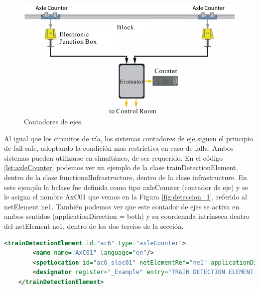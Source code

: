     \begin{figure}[!h]
        \centering
        \includegraphics[width=1\textwidth]{Figuras/contador.jpg}
        \centering\caption{Contadores de ejes.}
        \label{fig:deteccion_2}
    \end{figure}

    Al igual que los circuitos de vía, los sistemas contadores de eje siguen el principio de fail-safe, adoptando la condición mas restrictiva en caso de falla. Ambos sistemas pueden utilizarse en simultáneo, de ser requerido. En el código \ref{lst:axleCounter} podemos ver un ejemplo de la clase trainDetectionElement, dentro de la clase functionalInfrastructure, dentro de la clase infrastructure. En este ejemplo la bclase fue definida como tipo axleCounter (contador de eje) y se le asigna el nombre AxC01 que vemos en la Figura \ref{fig:deteccion_1}, referido al netElement ne1. También podemos ver que este contador de ejes se activa en ambos sentidos (applicationDirection = both) y su coordenada intrínseca dentro del netElement ne1, dentro de los dos tercios de la sección.

    \begin{lstlisting}[language = XML, caption = Clase trainDetectionElement , label = {lst:axleCounter}]
    <trainDetectionElement id="ac6" type="axleCounter">
        <name name="AxC01" language="en"/>
        <spotLocation id="ac6_sloc01" netElementRef="ne1" applicationDirection="both" intrinsicCoord="0.6710"/>
        <designator register="_Example" entry="TRAIN DETECTION ELEMENT AxC01"/>
    </trainDetectionElement>
    \end{lstlisting}